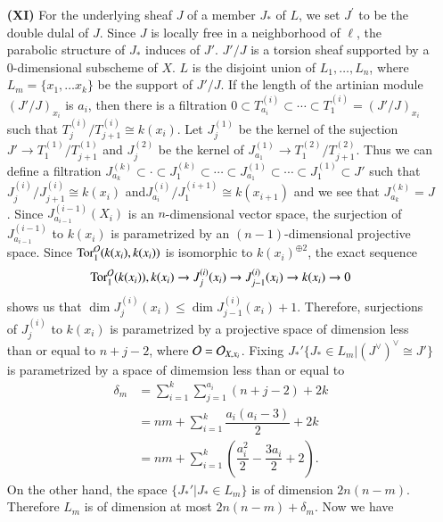 \begin{itemize}
\item[\bf(XI)] For the underlying sheaf $J$ of a member $J_{*}$ of $L$, we set $J^{'}$ to be the double dulal of $J$. Since $J$ is locally free in a neighborhood of $\ell$, the parabolic structure of $J_{*}$ induces of $J'$. $J'/J$ is a torsion sheaf supported by a 0-dimensional subscheme of $X$. $L$ is the disjoint union of $L_{1}, \ldots, L_{n}$, where $L_{m}=\{x_{1}, \ldots x_{k}\}$ be the support of $J'/J$. If the length of the artinian module $(J'/J)_{x_{i}}$ is $a_{i}$, then there is a filtration $0 \subset T_{a_{i}}^{(i)}\subset \cdots \subset T_{1}^{(i)} = (J'/J)_{x_{i}}$ such that $T_{j}^{(i)}/T_{j+1}^{(i)} \cong k(x_{i})$. Let $J_{j}^{(1)}$ be the kernel of the sujection $J'\rightarrow T_{1}^{(1)} /T_{j+1}^{(1)}$ and $J_{j}^{(2)}$ be the kernel of $J_{a_{1}}^{(1)} \rightarrow T_{1}^{(2)} /T_{j+1}^{(2)}$. Thus we can define a filtration $J_{a_{k}}^{(k)}\subset \cdot \subset J_{1}^{(k)}\subset \cdots\subset J_{a_{1}}^{(1)} \subset \cdots \subset J_{1}^{(1)} \subset J'$ such that $J_{j}^{(i)} /J_{j+1}^{(i)} \cong k(x_{i})$ and\pageoriginale $J_{a_{i}}^{(i)} /J_{1}^{(i +1)} \cong k(x_{i+1})$ and we see that $J_{a_{k}}^{(k)}= J$. Since $J_{a_{i-1}}^{(i-1)}(X_{i})$ is an $n$-dimensional vector space, the surjection of $J_{a_{i-1}}^{(i-1)}$ to $k(x_{i})$ is parametrized by an $(n-1)$-dimensional projective space. Since $\operatorname{Tor}_{1}^{\mathcal{O}}(k(x_{i}), k(x_{i}))$ is isomorphic to $k(x_{i})^{\oplus 2}$, the exact sequence
$$
\operatorname{Tor}_{1}^{\mathcal{O}}(k(x_{i})), k(x_{i}) \rightarrow J_{j}^{(i)}(x_{i}) \rightarrow J_{j-1}^{(i)}(x_{i}) \rightarrow k(x_{i})\rightarrow 0
$$
shows us that $\dim J_{j}^{(i)}(x_{i})\leq \dim J_{j-1}^{(i)}(x_{i}) + 1$. Therefore, surjections of $J_{j}^{(i)}$ to $k(x_{i})$ is parametrized by a projective space of dimension less than or equal to $n+j-2$, where $\mathcal{O} = \mathcal{O}_{X, x_{i}}$. Fixing $J_{*}'\{J_{*} \in L_{m} |(J^{\vee})^{\vee} \cong J'\}$ is parametrized by a space of dimemsion less than or equal to
\begin{align*}
\delta_{m}&= \sum\limits_{i=1}^{k}\sum\limits_{j=1}^{a_{i}} (n+j-2) + 2k\\
 &= nm + \sum\limits_{i=1}^{k}\dfrac{a_{i}(a_{i}-3)}{2} + 2k\\
 &= nm + \sum\limits_{i=1}^{k}\left(\dfrac{a_{i}^{2}}{2}-\dfrac{3a_{i}}{2} + 2 \right).
\end{align*}
On the other hand, the space $\{J_{*}' |J_{*} \in L_{m}\}$ is of dimension $2n(n-m)$. Therefore $L_{m}$ is of dimension at most $2n(n-m)+ \delta_{m}$. Now we have
\begin{equation*}

\end{equation*}
\end{itemize}
